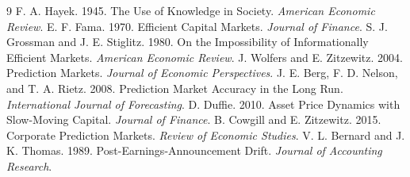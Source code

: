 \documentclass[sigconf,anonymous]{acmart}
\begin{document}
\begin{thebibliography}{9}
 F. A. Hayek. 1945. The Use of Knowledge in Society. \emph{American Economic Review}.
 E. F. Fama. 1970. Efficient Capital Markets. \emph{Journal of Finance}.
 S. J. Grossman and J. E. Stiglitz. 1980. On the Impossibility of Informationally Efficient Markets. \emph{American Economic Review}.
 J. Wolfers and E. Zitzewitz. 2004. Prediction Markets. \emph{Journal of Economic Perspectives}.
 J. E. Berg, F. D. Nelson, and T. A. Rietz. 2008. Prediction Market Accuracy in the Long Run. \emph{International Journal of Forecasting}.
 D. Duffie. 2010. Asset Price Dynamics with Slow-Moving Capital. \emph{Journal of Finance}.
 B. Cowgill and E. Zitzewitz. 2015. Corporate Prediction Markets. \emph{Review of Economic Studies}.
 V. L. Bernard and J. K. Thomas. 1989. Post-Earnings-Announcement Drift. \emph{Journal of Accounting Research}.
\end{thebibliography}
\end{document}
